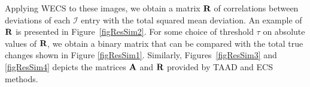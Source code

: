 \documentclass[journal]{IEEEtran}
\newcommand{\vA}{{\textbf A}}
\newcommand{\vR}{{\textbf R}}
\begin{document}
Applying WECS to these images, we obtain a matrix $\vR$ of correlations between deviations of each $\mathcal{I}$ entry with the total squared mean deviation. An example of $\vR$ is presented in Figure~\ref{figResSim2}. For some choice of threshold $\tau$ on absolute values of $\vR$, we obtain a binary matrix that can be compared with the total true changes shown in Figure \ref{figResSim1}.
Similarly, Figures~\ref{figResSim3} and \ref{figResSim4} depicts the matrices $\vA$ and $\vR$ provided by TAAD and ECS methods.


\end{document}
